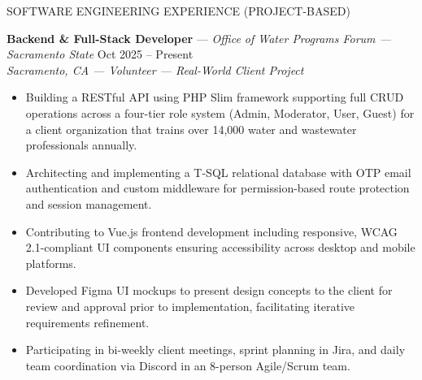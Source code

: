 \documentclass{resume}
\begin{document}
\begin{rSection}{SOFTWARE ENGINEERING EXPERIENCE (PROJECT-BASED)}

\textbf{Backend \& Full-Stack Developer} --- \textit{Office of Water Programs Forum --- Sacramento State} \hfill Oct 2025 -- Present \\
\textit{Sacramento, CA --- Volunteer --- Real-World Client Project}
\begin{itemize}
    \item Building a RESTful API using PHP Slim framework supporting full CRUD operations across a four-tier role system (Admin, Moderator, User, Guest) for a client organization that trains over 14,000 water and wastewater professionals annually.
    \item Architecting and implementing a T-SQL relational database with OTP email authentication and custom middleware for permission-based route protection and session management.
    \item Contributing to Vue.js frontend development including responsive, WCAG 2.1-compliant UI components ensuring accessibility across desktop and mobile platforms.
    \item Developed Figma UI mockups to present design concepts to the client for review and approval prior to implementation, facilitating iterative requirements refinement.
    \item Participating in bi-weekly client meetings, sprint planning in Jira, and daily team coordination via Discord in an 8-person Agile/Scrum team.
\end{itemize}


\end{rSection}
\end{document}
